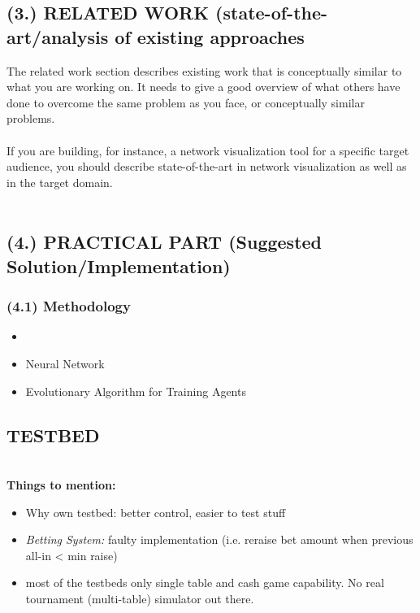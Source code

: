 \subsection{(3.) RELATED WORK (state-of-the-art/analysis of existing approaches}
The related work section describes existing work that is conceptually similar to what you are working on. It needs to give a good overview of what others have done to overcome the same problem as you face, or conceptually similar problems.\\\\
If you are building, for instance, a network visualization tool for a specific target audience, you should describe state-of-the-art in
network visualization as well as in the target domain.\\\\
\subsection{(4.) PRACTICAL PART (Suggested Solution/Implementation)} 
\subsubsection{(4.1) Methodology}
\begin{itemize}
\item {}
\item Neural Network
\item Evolutionary Algorithm for Training Agents
\end{itemize}
\pagebreak
\subsection{TESTBED}
\ \\
\textbf{Things to mention:}\\
\begin{itemize}
\item Why own testbed: 
\subitem better control, easier to test stuff
\item \textit{Betting System:} faulty implementation (i.e. reraise bet amount when previous all-in < min raise)
\item most of the testbeds only single table and cash game capability. No real tournament (multi-table) simulator out there. 
\end{itemize}
